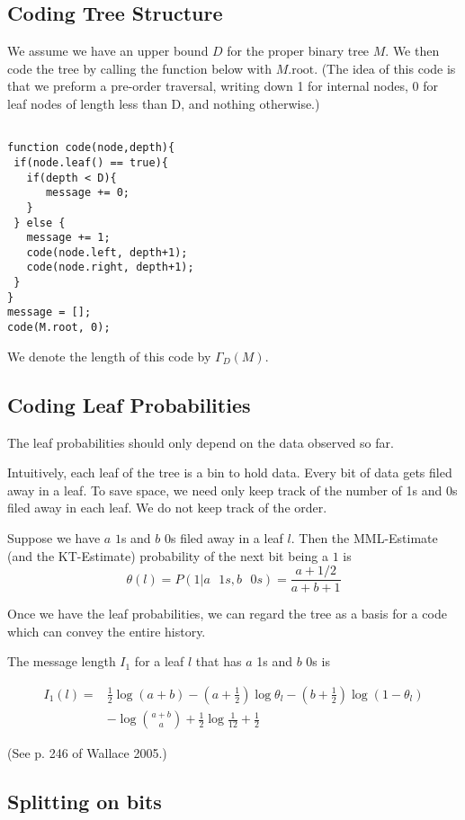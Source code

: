 \documentclass[12pt,a4paper,twoside]{article}
\theoremstyle{upright}
\begin{document}
\subsection{Coding Tree Structure}

We assume we have an upper bound $D$ for the proper binary tree $M$. We then code the tree by calling the function below with $M\text{.root}$.
(The idea of this code is that we preform a pre-order traversal, writing down 1 for internal nodes, 0 for leaf nodes of length less than D, and nothing otherwise.)

\begin{verbatim}

function code(node,depth){
 if(node.leaf() == true){
   if(depth < D){
      message += 0;
   }
 } else {
   message += 1;    
   code(node.left, depth+1);
   code(node.right, depth+1);
 }
}
message = [];
code(M.root, 0);
\end{verbatim}

We denote the length of this code by $\Gamma_D(M)$.

\subsection{Coding Leaf Probabilities}

The leaf probabilities should only depend on the data observed so far.

Intuitively, each leaf of the tree is a bin to hold data. Every bit of data gets filed away in a leaf. To save space, we need only keep track of the number of 1s and 0s filed away 
in each leaf. We do not keep track of the order.

Suppose we have $a$ $1$s and $b$ $0$s filed away in a leaf $l$.
Then the MML-Estimate (and the KT-Estimate) probability of the next bit being a $1$ is
\[
\theta(l) = P(1 | \text{$a$ } 1s , \text{$b$ } 0s ) = \frac{a + 1/2}{a+b+1} 
\]

Once we have the leaf probabilities, we can regard the tree as a basis for a code which
can convey the entire history.

The message length $I_1$ for a leaf $l$ that has $a$ 1s and $b$ 0s is

\begin{align*}
I_1(l) = & \frac{1}{2} \log(a+b) - (a+\frac{1}{2}) \log \theta_l - (b + \frac{1}{2})\log(1-\theta_l) \\
& - \log {a+b \choose a} + \frac{1}{2} \log \frac{1}{12} + \frac{1}{2}
\end{align*}

(See p. 246 of Wallace 2005.)

\subsection{Splitting on bits}
\end{document}
